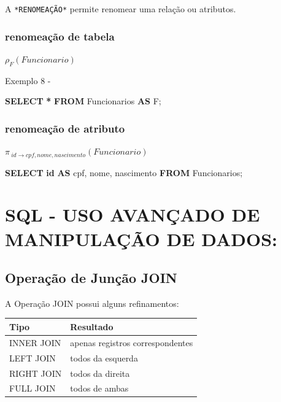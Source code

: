 \documentclass[
]{book}
\newenvironment{Shaded}{\begin{snugshade}}{\end{snugshade}}
\newcommand{\KeywordTok}[1]{\textcolor[rgb]{0.13,0.29,0.53}{\textbf{#1}}}
\newcommand{\NormalTok}[1]{#1}
\newcommand{\OperatorTok}[1]{\textcolor[rgb]{0.81,0.36,0.00}{\textbf{#1}}}
\begin{document}
A \texttt{*RENOMEAÇÃO*} permite renomear uma relação ou atributos.

\subsubsection{renomeação de tabela}\label{renomeauxe7uxe3o-de-tabela}

\(\rho_{F}(Funcionario)\)

Exemplo 8 -

\begin{Shaded}
\begin{Highlighting}[]

\KeywordTok{SELECT} \OperatorTok{*} \KeywordTok{FROM}\NormalTok{ Funcionarios }\KeywordTok{AS}\NormalTok{ F;}
\end{Highlighting}
\end{Shaded}

\subsubsection{renomeação de atributo}\label{renomeauxe7uxe3o-de-atributo}

\(\pi_{\ id \rightarrow cpf, nome,nascimento}(Funcionario)\)

\begin{Shaded}
\begin{Highlighting}[]

\KeywordTok{SELECT} \KeywordTok{id} \KeywordTok{AS}\NormalTok{ cpf, nome, nascimento }\KeywordTok{FROM}\NormalTok{ Funcionarios;}
\end{Highlighting}
\end{Shaded}

\section{SQL - USO AVANÇADO DE MANIPULAÇÃO DE DADOS:}\label{sql---uso-avanuxe7ado-de-manipulauxe7uxe3o-de-dados}

\subsection{Operação de Junção JOIN}\label{operauxe7uxe3o-de-junuxe7uxe3o-join}

A Operação JOIN possui alguns refinamentos:

\begin{longtable}[]{@{}ll@{}}
\toprule\noalign{}
Tipo & Resultado \\
\midrule\noalign{}
\endhead
\bottomrule\noalign{}
\endlastfoot
INNER JOIN & apenas registros correspondentes \\
LEFT JOIN & todos da esquerda \\
RIGHT JOIN & todos da direita \\
FULL JOIN & todos de ambas \\
\end{longtable}
\end{document}
